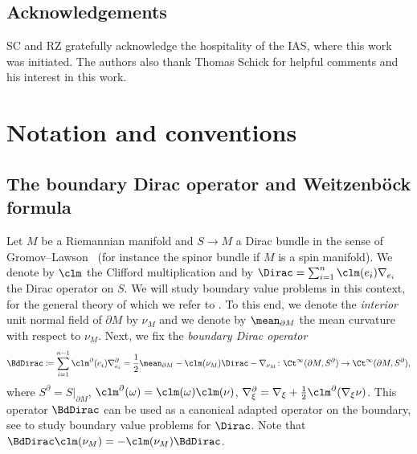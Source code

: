 \documentclass[a4paper,11pt]{amsart}
\numberwithin{equation}{section}
\begin{document}
\subsection*{Acknowledgements}
SC and RZ gratefully acknowledge the hospitality of the IAS, where this work was initiated.
The authors also thank Thomas Schick for helpful comments and his interest in this work.




\section{Notation and conventions}\label{sec:notation}
\subsection{The boundary Dirac operator and Weitzenböck formula}\label{subsec:boundary_dirac}
Let \(M\) be a Riemannian manifold and \(S \to M\) a Dirac bundle in the sense of Gromov--Lawson~\cites[\S 1]{GL1983}[Chapter II \S 5]{LawsonMichelsohn} (for instance the spinor bundle if \(M\) is a spin manifold).
We denote by \(\clm\) the Clifford multiplication and by \(\Dirac = \sum_{i=1}^n \clm(e_i)\nabla_{e_i} \) the Dirac operator on \(S\).
We will study boundary value problems in this context, for the general theory of which we refer to \textcite{Baer-Ballmann:Boundary-value-problems-first-order,Baer-Ballmann:Guide-Boundary-value-problems-Dirac}.
To this end, we denote the \emph{interior} unit normal field of \(\partial M\) by \(\nu_M\) and we denote by $\mean_{\partial M}$ the mean curvature with respect to $\nu_M$. 
Next, we fix the \emph{boundary Dirac operator}
\begin{equation}
  \BdDirac \coloneqq \sum_{i=1}^{n-1} \clm^{\partial}(e_i) \nabla^\partial_{e_i} = \frac{1}{2} \mean_{\partial M} - \clm(\nu_M) \Dirac - \nabla_{\nu_M} \colon \Ct^\infty(\partial M, S^\partial) \to \Ct^\infty(\partial M, S^\partial), \label{eq:boundary_dirac}
\end{equation}
where \(S^\partial = S|_{\partial M}\), \(\clm^\partial(\omega) = \clm(\omega)\clm(\nu)\), \(\nabla^\partial_\xi = \nabla_\xi + \frac{1}{2} \clm^\partial(\nabla_\xi \nu)\).
This operator \(\BdDirac\) can be used as a canonical adapted operator on the boundary, see \cite[Appendix~1]{Baer-Ballmann:Guide-Boundary-value-problems-Dirac} to study boundary value problems for \(\Dirac\).
Note that \(\BdDirac \clm(\nu_M) = - \clm(\nu_M) \BdDirac\).
\end{document}
